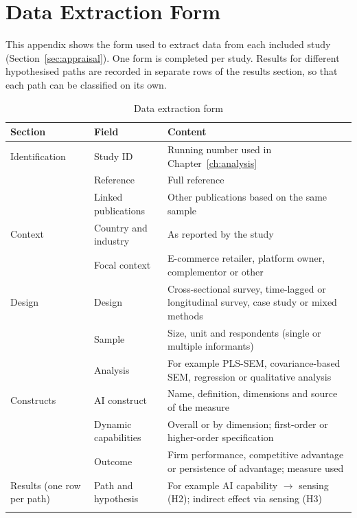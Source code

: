 
\chapter{Data Extraction Form}
\label{AppendixB}

This appendix shows the form used to extract data from each included study (Section~\ref{sec:appraisal}). One form is completed per study. Results for different hypothesised paths are recorded in separate rows of the results section, so that each path can be classified on its own.

\begin{table}[htbp]
\centering
\caption{Data extraction form}
\label{tab:extraction}
\footnotesize
\renewcommand{\arraystretch}{1.1}\setlength{\tabcolsep}{4pt}
\begin{tabularx}{\textwidth}{|>{\raggedright\arraybackslash}p{2.3cm}|>{\raggedright\arraybackslash}p{3.4cm}|>{\raggedright\arraybackslash}X|}
\hline
\textbf{Section} & \textbf{Field} & \textbf{Content} \\
\hline
Identification & Study ID & Running number used in Chapter~\ref{ch:analysis} \\ \cline{2-3}
 & Reference & Full reference \\ \cline{2-3}
 & Linked publications & Other publications based on the same sample \\
\hline
Context & Country and industry & As reported by the study \\ \cline{2-3}
 & Focal context & E-commerce retailer, platform owner, complementor or other \\
\hline
Design & Design & Cross-sectional survey, time-lagged or longitudinal survey, case study or mixed methods \\ \cline{2-3}
 & Sample & Size, unit and respondents (single or multiple informants) \\ \cline{2-3}
 & Analysis & For example PLS-SEM, covariance-based SEM, regression or qualitative analysis \\
\hline
Constructs & AI construct & Name, definition, dimensions and source of the measure \\ \cline{2-3}
 & Dynamic capabilities & Overall or by dimension; first-order or higher-order specification \\ \cline{2-3}
 & Outcome & Firm performance, competitive advantage or persistence of advantage; measure used \\
\hline
Results (one row per path) & Path and hypothesis & For example AI capability $\rightarrow$ sensing (H2); indirect effect via sensing (H3) \\ \cline{2-3}

\end{tabularx}
\end{table}
